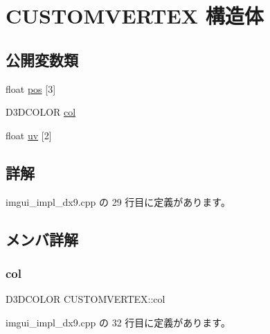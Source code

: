 \hypertarget{struct_c_u_s_t_o_m_v_e_r_t_e_x}{}\section{C\+U\+S\+T\+O\+M\+V\+E\+R\+T\+EX 構造体}
\label{struct_c_u_s_t_o_m_v_e_r_t_e_x}
\subsection*{公開変数類}
\begin{DoxyCompactItemize}
\item 
float \mbox{\hyperlink{struct_c_u_s_t_o_m_v_e_r_t_e_x_acbccf678628bfc243d77a99c1d7c7af3}{pos}} \mbox{[}3\mbox{]}
\item 
D3\+D\+C\+O\+L\+OR \mbox{\hyperlink{struct_c_u_s_t_o_m_v_e_r_t_e_x_a89194164a47349e936f21e10bb29f26a}{col}}
\item 
float \mbox{\hyperlink{struct_c_u_s_t_o_m_v_e_r_t_e_x_a2c27e901db37bc828fb408010596304c}{uv}} \mbox{[}2\mbox{]}
\end{DoxyCompactItemize}


\subsection{詳解}


 imgui\+\_\+impl\+\_\+dx9.\+cpp の 29 行目に定義があります。



\subsection{メンバ詳解}
\mbox{\label{struct_c_u_s_t_o_m_v_e_r_t_e_x_a89194164a47349e936f21e10bb29f26a}} 
\subsubsection{\texorpdfstring{col}{col}}
{\footnotesize\ttfamily D3\+D\+C\+O\+L\+OR C\+U\+S\+T\+O\+M\+V\+E\+R\+T\+E\+X\+::col}



 imgui\+\_\+impl\+\_\+dx9.\+cpp の 32 行目に定義があります。

\mbox{\label{struct_c_u_s_t_o_m_v_e_r_t_e_x_acbccf678628bfc243d77a99c1d7c7af3}} 
